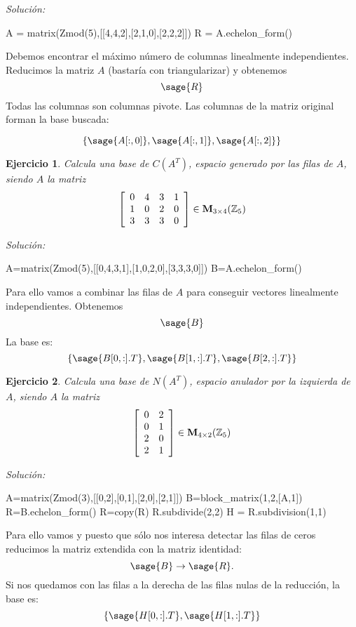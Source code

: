 \documentclass{amsart}
\newtheorem{ejer}{Ejercicio}
\begin{document}
{\it Soluci\'on:}
\begin{sageblock}
A = matrix(Zmod(5),[[4,4,2],[2,1,0],[2,2,2]])
R = A.echelon_form()
\end{sageblock}
Debemos encontrar el máximo número de columnas linealmente independientes. 
Reducimos la matriz $A$ (bastaría con triangularizar) y obtenemos
\[ \sage{R} \] Todas las columnas son columnas pivote. Las columnas de la 
matriz original forman la base buscada:

\[ \left\lbrace \sage{A[:,0]}, \sage{A[:,1]}, \sage{A[:,2]}  \right\rbrace \]




\begin{ejer} Calcula una base de $C(A^T)$, espacio generado por las filas de $A$, siendo $A$ la matriz
\[ \left[\begin{array}{rrrr}
0 & 4 & 3 & 1 \\
1 & 0 & 2 & 0 \\
3 & 3 & 3 & 0 
\end{array}\right] \in {\bf M}_{3 \times 4}({\mathbb Z}_{5})\]
\end{ejer}

{\it Soluci\'on:}
\begin{sageblock}
A=matrix(Zmod(5),[[0,4,3,1],[1,0,2,0],[3,3,3,0]])
B=A.echelon_form()
\end{sageblock}
Para ello vamos a combinar las filas de $A$ para conseguir vectores 
linealmente independientes. Obtenemos
\[ \sage{B} \] La base es:
\[ \left\lbrace \sage{B[0,:].T}, \sage{B[1,:].T}, \sage{B[2,:].T} \right\rbrace \] 


\begin{ejer} Calcula una base de $N(A^T)$, espacio anulador por la izquierda de 
$A$, siendo $A$ la matriz
\[ \left[\begin{array}{rr}
0 & 2 \\
0 & 1 \\
2 & 0 \\ 
2 & 1 
\end{array}\right] \in {\bf M}_{4 \times 2}({\mathbb Z}_{5})\]
\end{ejer}

{\it Soluci\'on:}
\begin{sageblock}
A=matrix(Zmod(3),[[0,2],[0,1],[2,0],[2,1]])
B=block_matrix(1,2,[A,1])
R=B.echelon_form()
R=copy(R)
R.subdivide(2,2)
H = R.subdivision(1,1)
\end{sageblock}
Para ello vamos y puesto que sólo nos interesa detectar las filas de ceros 
reducimos la matriz extendida con la matriz identidad: 
$$\sage{B} \to \sage{R}. $$
Si nos quedamos con las filas a la derecha de las filas nulas de la reducción, 
la base es:
\[ \left\lbrace \sage{H[0,:].T}, \sage{H[1,:].T}  \right\rbrace   \] 
\end{document}
